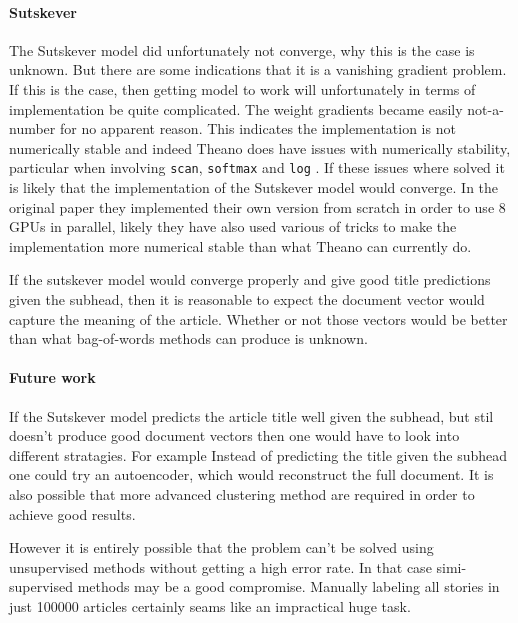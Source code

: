 \paragraph{Sutskever} The Sutskever model did unfortunately not converge, why this is the case is unknown. But there are some indications that it is a vanishing gradient problem. If this is the case, then getting model to work will unfortunately in terms of implementation be quite complicated. The weight gradients became easily not-a-number for no apparent reason. This indicates the implementation is not numerically stable and indeed Theano does have issues with numerically stability, particular when involving \texttt{scan}, \texttt{softmax} and \texttt{log} \cite{theano-issue}. If these issues where solved it is likely that the implementation of the Sutskever model would converge. In the original paper \cite{sutskever} they implemented their own version from scratch in order to use 8 GPUs in parallel, likely they have also used various of tricks to make the implementation more numerical stable than what Theano can currently do.

If the sutskever model would converge properly and give good title predictions given the subhead, then it is reasonable to expect the document vector would capture the meaning of the article. Whether or not those vectors would be better than what bag-of-words methods can produce is unknown.

\paragraph{Future work} If the Sutskever model predicts the article title well given the subhead, but stil doesn't produce good document vectors then one would have to look into different stratagies. For example Instead of predicting the title given the subhead one could try an autoencoder, which would reconstruct the full document. It is also possible that more advanced clustering method are required in order to achieve good results.

However it is entirely possible that the problem can't be solved using unsupervised methods without getting a high error rate. In that case simi-supervised methods may be a good compromise. Manually labeling all stories in just 100000 articles certainly seams like an impractical huge task.
 